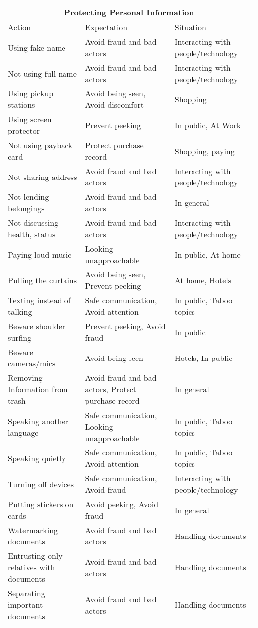 \begin{table}[H]
    \centering
\begin{tabular}{ |p{5cm}||p{6cm}|p{4cm}|  }
\hline
\multicolumn{3}{|c|}{Protecting Personal Information} \\
\hline
\hline
    Action & Expectation & Situation\\
\hline
\hline
    Using fake name & Avoid fraud and bad actors & Interacting with people/technology \\
\hline
    Not using full name & Avoid fraud and bad actors  & Interacting with people/technology \\
\hline
    Using pickup stations & Avoid being seen, Avoid discomfort & Shopping \\
\hline
    Using screen protector & Prevent peeking & In public, At Work \\
\hline
    Not using payback card & Protect purchase record & Shopping, paying \\
\hline
    Not sharing address & Avoid fraud and bad actors & Interacting with people/technology \\
\hline
    Not lending belongings & Avoid fraud and bad actors & In general \\
\hline
    Not discussing health, status & Avoid fraud and bad actors & Interacting with people/technology \\
\hline
    Paying loud music & Looking unapproachable & In public, At home \\
\hline
    Pulling the curtains & Avoid being seen, Prevent peeking & At home, Hotels \\
\hline
    Texting instead of talking & Safe communication, Avoid attention & In public, Taboo topics \\
\hline
    Beware shoulder surfing & Prevent peeking, Avoid fraud & In public \\
\hline
    Beware cameras/mics & Avoid being seen & Hotels, In public \\
\hline
    Removing Information from trash & Avoid fraud and bad actors, Protect purchase record & In general \\
\hline
    Speaking another language & Safe communication, Looking unapproachable & In public, Taboo topics \\
\hline
    Speaking quietly & Safe communication, Avoid attention & In public, Taboo topics \\
\hline
    Turning off devices & Safe communication, Avoid fraud & Interacting with people/technology \\
\hline
    Putting stickers on cards & Avoid peeking, Avoid fraud & In general \\
\hline
    Watermarking documents & Avoid fraud and bad actors & Handling documents \\
\hline
    Entrusting only relatives with documents & Avoid fraud and bad actors & Handling documents \\
\hline
    Separating important documents & Avoid fraud and bad actors & Handling documents \\
\hline
    

\end{tabular}
\end{table}
